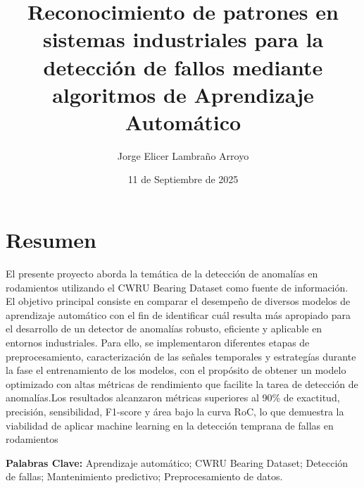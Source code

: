 \documentclass[11pt,a4paper,spanish]{book}
\title{Reconocimiento de patrones en sistemas industriales para la detección de fallos
		mediante algoritmos de Aprendizaje Automático}
\author{Jorge Elicer Lambraño Arroyo}
\date{11 de Septiembre de 2025}
\numberwithin{equation}{chapter}
\numberwithin{figure}{chapter}
\begin{document}
\renewcommand{\listfigurename}{Índice de Ilustraciones}
\renewcommand{\listtablename}{Índice de Tablas}
\renewcommand{\contentsname}{Índice de Contenidos}
\renewcommand{\figurename}{Figura}
\renewcommand{\tablename}{Tabla} 

\maketitle

\frontmatter
\tableofcontents
\listoffigures
\listoftables

\chapter{Resumen}
El presente proyecto aborda la temática de  la detección de anomalías en rodamientos 
utilizando el CWRU Bearing Dataset como fuente de información. El objetivo principal 
consiste en comparar el desempeño de diversos modelos de aprendizaje automático con el 
fin de identificar cuál resulta más apropiado para el desarrollo de un detector de 
anomalías robusto, eficiente y aplicable en entornos industriales. Para ello, se 
implementaron diferentes etapas de preprocesamiento,  caracterización de las señales 
temporales y estrategías durante la fase el entrenamiento de los modelos, con el 
propósito de obtener un modelo optimizado con altas métricas de rendimiento que facilite
la tarea de detección de anomalías.Los resultados alcanzaron métricas superiores al 
90\% de exactitud, precisión, sensibilidad, F1-score y área bajo la curva RoC, lo que 
demuestra la viabilidad de aplicar machine learning en la detección temprana de fallas
en rodamientos

{\bf Palabras Clave:} Aprendizaje automático; CWRU Bearing Dataset; Detección de fallas;
Mantenimiento predictivo; Preprocesamiento de datos.
\end{document}
